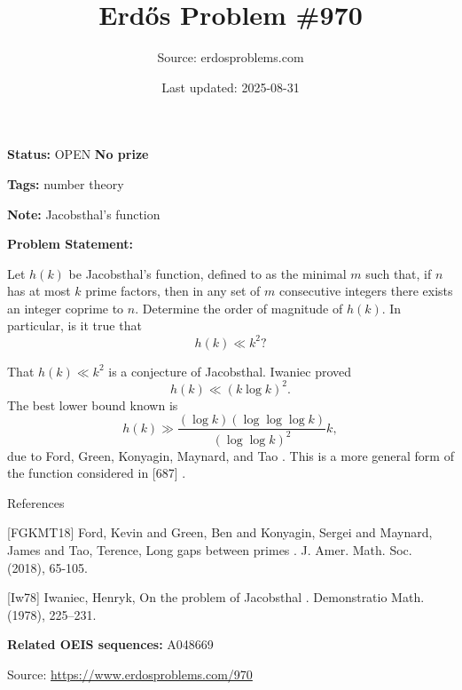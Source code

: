 \documentclass{article}
\title{Erd\H{o}s Problem \#970}
\date{Last updated: 2025-08-31}
\author{Source: erdosproblems.com}
\begin{document}
\maketitle

\noindent\textbf{Status:} OPEN \quad \textbf{No prize}

\noindent\textbf{Tags:} number theory

\medskip
\noindent\textbf{Note:} Jacobsthal's function

\medskip

\noindent\textbf{Problem Statement:}

Let $h(k)$ be Jacobsthal's function, defined to as the minimal $m$ such that, if $n$ has at most $k$ prime factors, then in any set of $m$ consecutive integers there exists an integer coprime to $n$. Determine the order of magnitude of $h(k)$. In particular, is it true that\[h(k) \ll k^2?\]




That $h(k)\ll k^2$ is a conjecture of Jacobsthal. Iwaniec \cite{Iw78} proved\[h(k) \ll (k\log k)^2.\]The best lower bound known is\[h(k) \gg \frac{(\log k)(\log\log\log k)}{(\log\log k)^2}k,\]due to Ford, Green, Konyagin, Maynard, and Tao \cite{FGKMT18}. This is a more general form of the function considered in [687] .




References

[FGKMT18] Ford, Kevin and Green, Ben and Konyagin, Sergei and Maynard, James and Tao, Terence, Long gaps between primes . J. Amer. Math. Soc. (2018), 65-105.

[Iw78] Iwaniec, Henryk, On the problem of {J}acobsthal . Demonstratio Math. (1978), 225--231.

\noindent\textbf{Related OEIS sequences:} A048669


\bigskip
\noindent\small{Source: \url{https://www.erdosproblems.com/970}}
\end{document}
